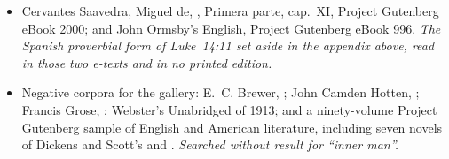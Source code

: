 \begin{itemize}[leftmargin=1.2em, itemsep=0.15em]
{Writings of Frank Forester}, ed.\ David W. Judd, vol.~2 (New York: Orange Judd
Company, 1882), p.~35, the page fixed by its running head. \textit{The gastric
sense of ``inner man'' in a checked witness of 1882, seven years before Jerome
K.~Jerome.}
\item Cervantes Saavedra, Miguel de, , Primera parte,
cap.~XI, Project Gutenberg eBook 2000; and John Ormsby's English, Project
Gutenberg eBook 996. \textit{The Spanish proverbial form of Luke~14:11 set aside
in the appendix above, read in those two e-texts and in no printed edition.}
%
\item Negative corpora for the gallery: E.~C. Brewer, ; John Camden Hotten, ; Francis Grose,
; Webster's Unabridged of
1913; and a ninety-volume Project Gutenberg sample of English and American
literature, including seven novels of Dickens and Scott's  and
. \textit{Searched without result for ``inner man''.}
\end{itemize}
